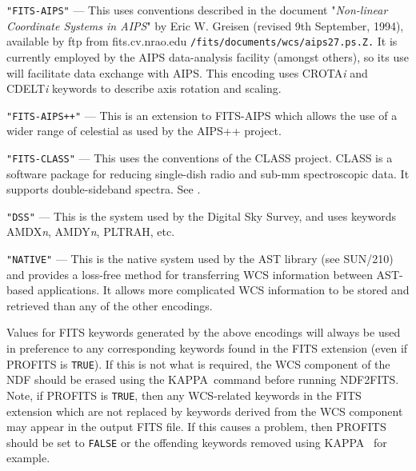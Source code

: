\documentclass[twoside,11pt]{starlink}
\providecommand{\KAPPA}{{\footnotesize KAPPA}}
\begin{document}
{{{         \sstitem
         \texttt{"FITS-AIPS"} --- This uses conventions described in the
         document "\textit{Non-linear Coordinate Systems in AIPS}" by
         Eric W. Greisen (revised 9th September, 1994), available by ftp
         from fits.cv.nrao.edu \texttt{/fits/documents/wcs/aips27.ps.Z.}
         It is currently employed by the AIPS data-analysis facility
         (amongst others), so its use
         will facilitate data exchange with AIPS. This encoding uses
         CROTA\textit{i} and CDELT\textit{i} keywords to describe axis
         rotation and scaling.

         \sstitem
         \texttt{"FITS-AIPS++"} --- This is an extension to FITS-AIPS which
         allows the use of a wider range of celestial as used by the AIPS++
         project.

         \sstitem
         \texttt{"FITS-CLASS"} --- This uses the conventions of the CLASS
         project.  CLASS is a software package for reducing single-dish
         radio and sub-mm spectroscopic data.  It supports double-sideband
         spectra.  See .

         \sstitem
         \texttt{"DSS"} --- This is the system used by the Digital Sky Survey, and
         uses keywords AMDX\textit{n}, AMDY\textit{n}, PLTRAH, etc.

         \sstitem
         \texttt{"NATIVE"} --- This is the native system used by the AST library (see
         SUN/210) and provides a loss-free method for transferring WCS
         information between AST-based applications.  It allows more
         complicated WCS information to be stored and retrieved than any of
         the other encodings.
      }

      Values for FITS keywords generated by the above encodings will
      always be used in preference to any corresponding keywords found in
      the FITS extension (even if PROFITS is \texttt{TRUE}).
      If this is not what
      is required, the WCS component of the NDF should be erased using
      the \KAPPA\ command  before running NDF2FITS. Note, if PROFITS
      is \texttt{TRUE}, then any WCS-related keywords in the FITS extension
      which are not replaced by keywords derived from the WCS component may
      appear in the output FITS file. If this causes a problem, then
      PROFITS should be set to \texttt{FALSE} or the offending keywords removed
      using \KAPPA\
      for example.
   }
   }
\end{document}
